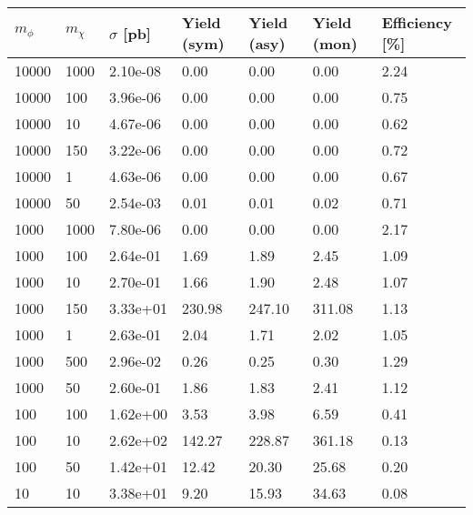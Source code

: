 \begin{table}
\footnotesize
\centering
\begin{tabular}{lllllll}
\hline
$m_\phi$ & $m_\chi$ & $\sigma$ [pb] & Yield (sym) & Yield (asy) & Yield (mon) & Efficiency [\%] \\ \hline
10000     &   1000      &   2.10e-08  &   0.00      &   0.00      &   0.00      &   2.24      \\ 
10000     &   100       &   3.96e-06  &   0.00      &   0.00      &   0.00      &   0.75      \\ 
10000     &   10        &   4.67e-06  &   0.00      &   0.00      &   0.00      &   0.62      \\ 
10000     &   150       &   3.22e-06  &   0.00      &   0.00      &   0.00      &   0.72      \\ 
10000     &   1         &   4.63e-06  &   0.00      &   0.00      &   0.00      &   0.67      \\ 
10000     &   50        &   2.54e-03  &   0.01      &   0.01      &   0.02      &   0.71      \\ 
1000      &   1000      &   7.80e-06  &   0.00      &   0.00      &   0.00      &   2.17      \\ 
1000      &   100       &   2.64e-01  &   1.69      &   1.89      &   2.45      &   1.09      \\ 
1000      &   10        &   2.70e-01  &   1.66      &   1.90      &   2.48      &   1.07      \\ 
1000      &   150       &   3.33e+01  &   230.98    &   247.10    &   311.08    &   1.13      \\ 
1000      &   1         &   2.63e-01  &   2.04      &   1.71      &   2.02      &   1.05      \\ 
1000      &   500       &   2.96e-02  &   0.26      &   0.25      &   0.30      &   1.29      \\ 
1000      &   50        &   2.60e-01  &   1.86      &   1.83      &   2.41      &   1.12      \\ 
100       &   100       &   1.62e+00  &   3.53      &   3.98      &   6.59      &   0.41      \\ 
100       &   10        &   2.62e+02  &   142.27    &   228.87    &   361.18    &   0.13      \\ 
100       &   50        &   1.42e+01  &   12.42     &   20.30     &   25.68     &   0.20      \\ 
10        &   10        &   3.38e+01  &   9.20      &   15.93     &   34.63     &   0.08      \\ 

\end{tabular}
\end{table}
